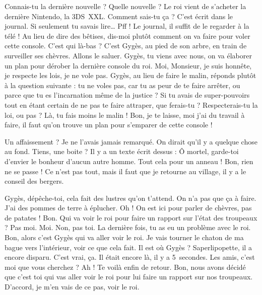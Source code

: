 \documentclass[12pt, a5paper, french]{memoir}
\begin{document}
\StageDir{\Gyges, \Bonnie, \Clyde}
\begin{drama}
\Bonniespeaks Connais-tu la dernière nouvelle ?
\Clydespeaks Quelle nouvelle ?
\Bonniespeaks Le roi vient de s’acheter la dernière Nintendo, la 3DS~XXL.
\Clydespeaks Comment sais-tu ça ?
\Bonniespeaks C’est écrit dans le journal. Si seulement tu savais lire\dots
\Clydespeaks Pff ! Le journal, il suffit de le regarder à la télé !
\Bonniespeaks Au lieu de dire des bêtises, dis-moi plutôt comment on va faire pour voler cette console.
\Clydespeaks {} C’est qui là-bas ?
\Bonniespeaks C’est Gygès, au pied de son arbre, en train de surveiller ses chèvres.
\Clydespeaks Allons le saluer.  Gygès, tu viens avec nous, on va élaborer un plan pour dérober la dernière console du roi.
\Gygesspeaks Moi, Monsieur, je suis honnête, je respecte les lois, je ne vole pas.
\Bonniespeaks Gygès, au lieu de faire le malin, réponds plutôt à la question suivante : tu ne voles pas, car tu as peur de te faire arrêter, ou parce que tu es l’incarnation même de la justice ? Si tu avais de super-pouvoirs tout en étant certain de ne pas te faire attraper, que ferais-tu ? Respecterais-tu la loi, ou pas ? Là, tu fais moins le malin ! Bon, je te laisse, moi j’ai du travail à faire, il faut qu’on trouve un plan pour s’emparer de cette console !

\scene

\StageDir{\Gyges}
\Gygesspeaks {} Un affaissement ? Je ne l’avais jamais remarqué. On dirait qu’il y a quelque chose au fond. Tiens, une boite ? Il y a un texte écrit dessus : \og Ô mortel, garde-toi d’envier le bonheur d’aucun autre homme. \fg{}  Tout cela pour un anneau !  Bon, rien ne se passe ! Ce n’est pas tout, mais il faut que je retourne au village, il y a le conseil des bergers.

\scene

\StageDir{\Gyges, \Leonardo, \Donatello, \Michelangelo, \Raffaello, \Tiziano}
\Leonardospeaks {} Gygès, dépêche-toi, cela fait des lustres qu’on t’attend. On n’a pas que ça à faire. J’ai des pommes de terre à éplucher.
\Donatellospeaks Oh ! On est ici pour parler de chèvres, pas de patates !
\Michelangelospeaks Bon. Qui va voir le roi pour faire un rapport sur l'état des troupeaux ?
\Raffaellospeaks Pas moi.
\Tizianospeaks Moi.
\Donatellospeaks Non, pas toi. La dernière fois, tu as eu un problème avec le roi.
\Leonardospeaks Bon, alors c’est Gygès qui va aller voir le roi.
\Gygesspeaks {} Je vais tourner le chaton de ma bague vers l’intérieur, voir ce que cela fait.
\Leonardospeaks Il est où Gygès ? Saperlipopette, il a encore disparu.
\Raffaellospeaks C’est vrai, ça. Il était encore là, il y a 5~secondes.
\Gygesspeaks {} Les amis, c’est moi que vous cherchez ?
\Tizianospeaks Ah ! Te voilà enfin de retour. Bon, nous avons décidé que c’est toi qui vas aller voir le roi pour lui faire un rapport sur nos troupeaux.
\Gygesspeaks D’accord, je m’en vais de ce pas, voir le roi.


\end{drama}
\end{document}
